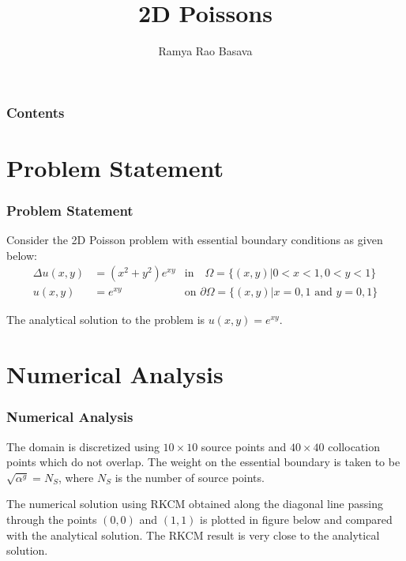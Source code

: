 \documentclass[9pt]{beamer}
\title{2D Poissons}
\author{Ramya Rao Basava}
\institute{CS, UBC}
\date{} %
\begin{document}
\begin{frame}
\titlepage
\end{frame}

\begin{frame}
\label{contents}
\frametitle{Contents}
\tableofcontents
\end{frame}

\section{Problem Statement}

\begin{frame}

\frametitle{Problem Statement}

Consider the 2D Poisson problem with essential boundary conditions as given
below:
\begin{align*}
\Delta u (x,y) &= (x^2+y^2)e^{xy} &\text{in} \quad \Omega = \{(x,y) \vert 0 < x < 1,0 < y < 1\} \\
u (x,y) &= e^{xy} \quad &\text{on }  \partial\Omega = \{(x,y) \vert x=0,1 \text{ and } y=0,1\}
\end{align*}

The analytical solution to the problem is $u (x,y) = e^{xy}$. 
\end{frame}


\section{Numerical Analysis}
\begin{frame}

\frametitle{Numerical Analysis}
The domain is discretized using $10\times10$ source points and  $40\times40$ collocation points which do not overlap. The weight on the essential boundary is taken to be $\sqrt{\alpha^g}=N_S$, where $N_S$ is the number of source points. 

\vspace{8pt}
The numerical solution using RKCM obtained along the diagonal line passing through the points $(0,0)$ and $(1,1)$ is plotted in figure below and compared with the analytical solution. The RKCM result is very close to the analytical solution.

\end{frame}
\end{document}
